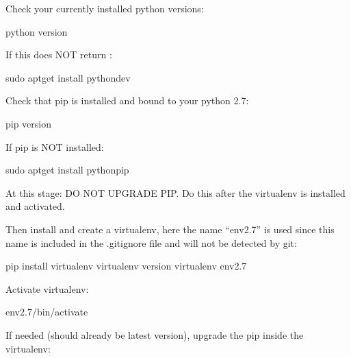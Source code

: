 \documentclass[letterpaper,10pt,english]{sphinxmanual}
\begin{document}
Check your currently installed python versions:

%
\begin{sphinxVerbatim}[commandchars=\\\{\}]
python \PYGZhy{}\PYGZhy{}version
\end{sphinxVerbatim}

If this does NOT return :

%
\begin{sphinxVerbatim}[commandchars=\\\{\}]
sudo apt\PYGZhy{}get install python\PYGZhy{}dev
\end{sphinxVerbatim}

Check that pip is installed and bound to your python 2.7:

%
\begin{sphinxVerbatim}[commandchars=\\\{\}]
pip \PYGZhy{}\PYGZhy{}version
\end{sphinxVerbatim}

If pip is NOT installed:

%
\begin{sphinxVerbatim}[commandchars=\\\{\}]
sudo apt\PYGZhy{}get install python\PYGZhy{}pip
\end{sphinxVerbatim}

At this stage: DO NOT UPGRADE PIP. Do this after the virtualenv is installed and activated.

Then install and create a virtualenv, here the name “env2.7” is used since this name is included in the .gitignore file and will not be detected by git:

%
\begin{sphinxVerbatim}[commandchars=\\\{\}]
pip install virtualenv
virtualenv \PYGZhy{}\PYGZhy{}version
virtualenv env2.7
\end{sphinxVerbatim}

Activate virtualenv:

%
\begin{sphinxVerbatim}[commandchars=\\\{\}]
 env2.7/bin/activate
\end{sphinxVerbatim}

If needed (should already be latest version), upgrade the pip inside the virtualenv:
\end{document}

